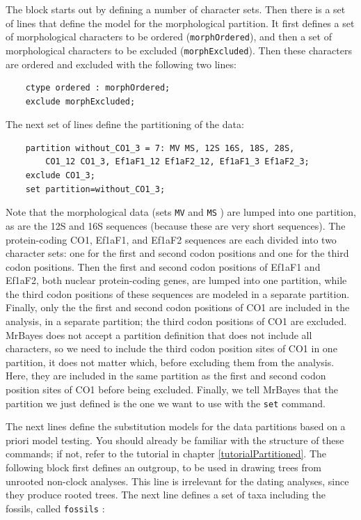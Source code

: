 \documentclass[12pt]{book}
\newcommand{\ttt}[1]{\texttt{#1} }
\begin{document}
The block starts out by defining a number of character sets. Then there is a set of lines that
define the model for the morphological partition. It first defines a set of morphological
characters to be ordered (\texttt{morphOrdered}), and then a set of morphological characters to be
excluded (\texttt{morphExcluded}).  Then these characters are ordered and excluded with the
following two lines:

\begin{singlespacing}
\begin{verbatim}
    ctype ordered : morphOrdered;
    exclude morphExcluded;
\end{verbatim}
\end{singlespacing}

The next set of lines define the partitioning of the data:

\begin{singlespacing}
\begin{verbatim}
    partition without_CO1_3 = 7: MV MS, 12S 16S, 18S, 28S,
        CO1_12 CO1_3, Ef1aF1_12 Ef1aF2_12, Ef1aF1_3 Ef1aF2_3;
    exclude CO1_3;
    set partition=without_CO1_3;
\end{verbatim}
\end{singlespacing}

Note that the morphological data (sets \ttt{MV} and \ttt{MS}) are lumped into one partition, as are
the 12S and 16S sequences (because these are very short sequences). The protein-coding CO1, Ef1aF1,
and Ef1aF2 sequences are each divided into two character sets: one for the first and second codon
positions and one for the third codon positions. Then the first and second codon positions of
Ef1aF1 and Ef1aF2, both nuclear protein-coding genes, are lumped into one partition, while the
third codon positions of these sequences are modeled in a separate partition. Finally, only the the
first and second codon positions of CO1 are included in the analysis, in a separate partition; the
third codon positions of CO1 are excluded. MrBayes does not accept a partition definition that does
not include all characters, so we need to include the third codon position sites of CO1 in one
partition, it does not matter which, before excluding them from the analysis. Here, they are
included in the same partition as the first and second codon position sites of CO1 before being
excluded.  Finally, we tell MrBayes that the partition we just defined is the one we want to use
with the \ttt{set} command.

The next lines define the substitution models for the data partitions based on a priori model
testing. You should already be familiar with the structure of these commands; if not, refer to the
tutorial in chapter \ref{tutorialPartitioned}.  The following block first defines an outgroup, to
be used in drawing trees from unrooted non-clock analyses. This line is irrelevant for the dating
analyses, since they produce rooted trees. The next line defines a set of taxa including the
fossils, called \ttt{fossils}:
\end{document}
